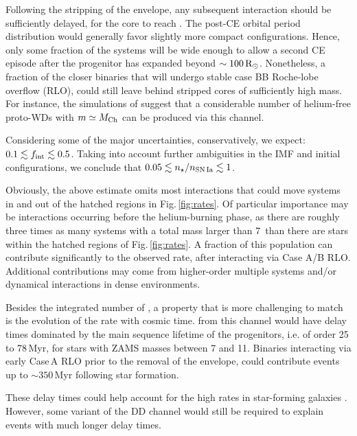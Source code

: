 \documentclass[../../main/thesis_msc.tex]{subfiles}
\begin{document}
Following the stripping of the envelope, any 
subsequent interaction should be sufficiently delayed, for the core to reach \mch. The post-CE orbital period distribution would generally favor slightly more compact configurations. Hence, only some fraction of the systems will be wide enough to allow 
 a second CE episode after the progenitor has expanded beyond $\sim 100\mathrm{\,R_\odot}$. 
Nonetheless, a fraction of the closer binaries that will undergo stable case BB Roche-lobe 
overflow (RLO), could still leave behind stripped \one cores of sufficiently high mass. For instance, the
 simulations of \cite{Tauris_ultra} suggest that   a considerable number of helium-free \one proto-WDs 
with $m\simeq M_{\mathrm{Ch}}$ can be produced via this channel. 

Considering some of the major uncertainties, conservatively, we expect: $0.1 \lesssim f_{\rm int}\lesssim 0.5$. 
Taking into account further ambiguities in the IMF and initial configurations, we conclude 
that $0.05\lesssim n_\star / n_{\rm SN\,Ia} \lesssim 1$. 

Obviously, the above estimate omits most interactions that could move systems in and out of the hatched regions in 
Fig.\,\ref{fig:rates}. Of particular importance may be interactions 
occurring before the helium-burning phase, as there are  
roughly three times as many systems with a total mass larger than 7\msun\  
than there are stars within the hatched regions of Fig.\,\ref{fig:rates}. 
A fraction of this population can contribute significantly to the observed rate, after interacting via Case A/B RLO. 
Additional contributions may come from higher-order multiple systems and/or dynamical interactions in dense environments.  


Besides the integrated number of \ias, a property that is more challenging to match is the evolution of the \ia rate with cosmic time. \ias from this channel would have delay times dominated by the main sequence lifetime of the progenitors, i.e. of order 25 to 78\,Myr, for stars with ZAMS masses between 7 and 11\msun. Binaries interacting via early Case\,A RLO prior to the removal of the envelope, could contribute events up to $\sim 350$\,Myr following star formation. 

These delay times could help account for the high \ia rates in star-forming galaxies \citep{Maoz:2010pz,claeys2014a}. 
However, some variant of the DD channel would still be required to explain events with much longer delay times.  
\end{document}

